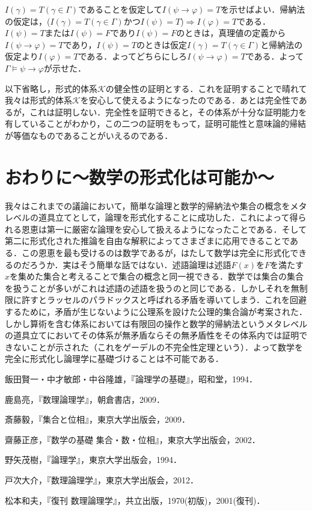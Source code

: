 \documentclass[10pt,b5paper,papersize,dvipdfmx]{jsbook}
\begin{document}
$I(\gamma)=T(\gamma \in \Gamma)$であることを仮定して$I(\psi \to \varphi)=T$を示せばよい．帰納法の仮定は，($I(\gamma)=T(\gamma \in \Gamma)$かつ$I(\psi)=T$)$\Rightarrow$$I(\varphi)=T$である．$I(\psi) = T$または$I(\psi) = F$であり$I(\psi) = F$のときは，真理値の定義から$I(\psi \to \varphi)=T$であり，$I(\psi) = T$のときは仮定$I(\gamma)=T(\gamma \in \Gamma)$と帰納法の仮定より$I(\varphi)=T$である．よってどちらにしろ$I(\psi \to \varphi)=T$である．よって$\Gamma \models \psi \to \varphi$が示せた．\par
以下省略し，形式的体系$\mathcal K$の健全性の証明とする．これを証明することで晴れて我々は形式的体系$\mathcal K$を安心して使えるようになったのである．あとは完全性であるが，これは証明しない．完全性を証明できると，その体系が十分な証明能力を有していることがわかり，この二つの証明をもって，証明可能性と意味論的帰結が等価なものであることがいえるのである．

\section{おわりに～数学の形式化は可能か～}
我々はこれまでの議論において，簡単な論理と数学的帰納法や集合の概念をメタレベルの道具立てとして，論理を形式化することに成功した．これによって得られる恩恵は第一に厳密な論理を安心して扱えるようになったことである．そして第二に形式化された推論を自由な解釈によってさまざまに応用できることである．この恩恵を最も受けるのは数学であるが，はたして数学は完全に形式化できるのだろうか．実はそう簡単な話ではない．述語論理は述語$F(x)$を$F$を満たす$x$を集めた集合と考えることで集合の概念と同一視できる．数学では集合の集合を扱うことが多いがこれは述語の述語を扱うのと同じである．しかしそれを無制限に許すとラッセルのパラドックスと呼ばれる矛盾を導いてしまう．これを回避するために，矛盾が生じないように公理系を設けた公理的集合論が考案された．しかし算術を含む体系においては有限回の操作と数学的帰納法というメタレベルの道具立てにおいてその体系が無矛盾ならその無矛盾性をその体系内では証明できないことが示された（これをゲーデルの不完全性定理という）．よって数学を完全に形式化し論理学に基礎づけることは不可能である．

\clearpage
\begin{thebibliography}{99}
  \item 飯田賢一・中才敏郎・中谷隆雄，『論理学の基礎』，昭和堂，1994．
  \item 鹿島亮，『数理論理学』，朝倉書店，2009．
  \item 斎藤毅，『集合と位相』，東京大学出版会，2009．
  \item 齋藤正彦，『数学の基礎 集合・数・位相』，東京大学出版会，2002．
  \item 野矢茂樹，『論理学』，東京大学出版会，1994．
  \item 戸次大介，『数理論理学』，東京大学出版会，2012．
  \item 松本和夫，『復刊 数理論理学』，共立出版，1970(初版)，2001(復刊)．
\end{thebibliography}
\end{document}
